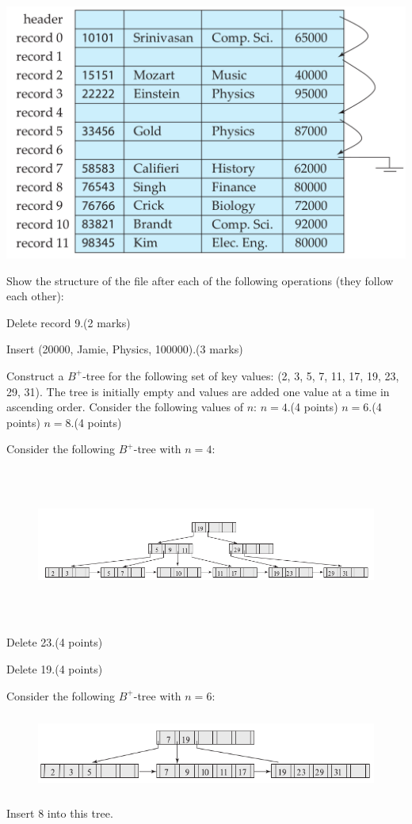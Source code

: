 \documentclass[a4 paper]{article}
\begin{document}
{\centering \includegraphics[width=\textwidth/2]{figure2.png}}

\noindent Show the structure of the file after each of the following operations (they follow each other):

 Delete record 9.\indent (2 marks)




 Insert (20000, Jamie, Physics, 100000).\indent (3 marks)





Construct a $B^{+}$-tree for the following set of key values: (2, 3, 5, 7, 11, 17, 19, 23, 29, 31). The tree is initially empty and values are added one value at a time in ascending order. Consider the following values of $n$:
 $n = 4$.\indent \indent (4 points)
 $n = 6$.\indent \indent (4 points)
 $n = 8$.\indent \indent (4 points)






Consider the following $B^{+}$-tree with $n = 4$:
\begin{figure}[h]
\includegraphics[height=2in, width=6in]{tree-delete.png}
\end{figure}

 Delete 23.\indent \indent (4 points)



 Delete 19.\indent \indent (4 points)



Consider the following $B^{+}$-tree with $n = 6$:
\begin{figure}[h]
\includegraphics[height=1in, width=5in]{tree-insert.png}
\end{figure}
Insert 8 into this tree.
\end{document}
